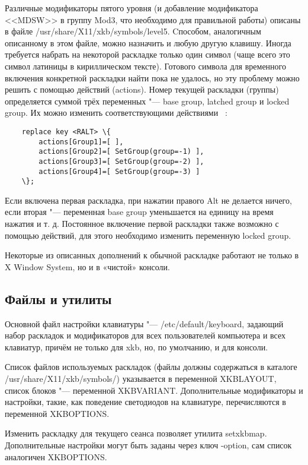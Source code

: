 \documentclass[10pt, a5paper]{article}
\begin{document}
Различные модификаторы пятого уровня (и добавление модификатора <<MDSW>> в группу Mod3, что необходимо для правильной работы) описаны в файле /usr/share/X11/xkb/symbols/level5. Cпособом, аналогичным описанному в этом файле, можно назначить и любую другую клавишу.
Иногда требуется набрать на некоторой раскладке только один символ (чаще всего это символ латиницы в кириллическом тексте). Готового символа для временного включения конкретной раскладки найти пока не удалось, но эту проблему можно решить с помощью действий (actions). Номер текущей раскладки (группы) определяется суммой трёх переменных "--- base group, latched group и locked group. Их можно изменить соответствующими действиями ~\cite{Kononova1}:

\begin{verbatim}
    replace key <RALT> \{
        actions[Group1]=[ ],
        actions[Group2]=[ SetGroup(group=-1) ],
        actions[Group3]=[ SetGroup(group=-2) ],
        actions[Group4]=[ SetGroup(group=-3) ]
    \};
\end{verbatim}

Если включена первая раскладка, при нажатии правого Alt не делается ничего, если вторая "--- переменная base group уменьшается на единицу на время нажатия и т. д. Постоянное включение первой раскладки также возможно с помощью действий, для этого необходимо изменить переменную locked group. 

Некоторые из описанных дополнений к обычной раскладке работают не только в X Window System, но и в «чистой» консоли.

\subsection*{Файлы и утилиты}

Основной файл настройки клавиатуры "--- /etc/default/keyboard, задающий набор раскладок и модификаторов для всех пользователей компьютера и всех клавиатур, причём не только для xkb, но, по умолчанию, и для консоли.

Список файлов используемых раскладок (файлы должны содержаться в каталоге /usr/share/X11/xkb/symbols/) указывается в переменной \linebreak XKBLAYOUT, список блоков "--- переменной XKBVARIANT. Дополнительные модификаторы и настройки, такие, как поведение светодиодов на клавиатуре, перечисляются в переменной XKBOPTIONS.

Изменить раскладку для текущего сеанса позволяет утилита setxkbmap. Дополнительные настройки могут быть заданы через ключ -option, сам список аналогичен XKBOPTIONS.
\end{document}

